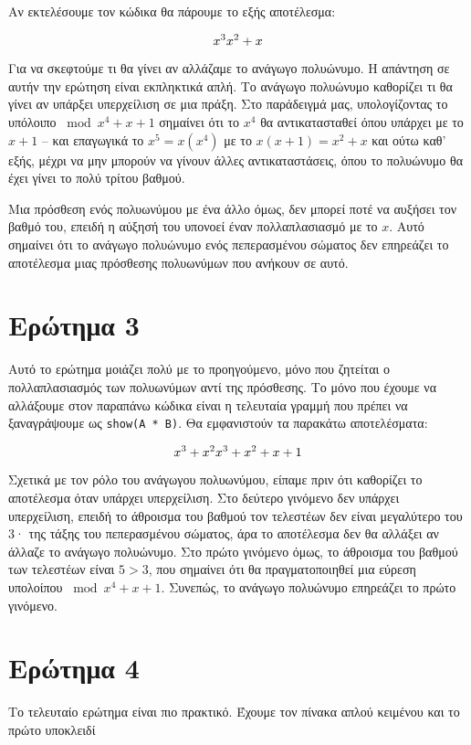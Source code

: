 \documentclass{article}
\begin{document}
Αν εκτελέσουμε τον κώδικα θα πάρουμε το εξής αποτέλεσμα:

$$
x^3 \\
x^2 + x
$$

Για να σκεφτούμε τι θα γίνει αν αλλάζαμε το ανάγωγο πολυώνυμο. Η απάντηση σε αυτήν την ερώτηση είναι εκπληκτικά απλή. Το ανάγωγο πολυώνυμο καθορίζει τι θα γίνει αν υπάρξει υπερχείλιση σε μια πράξη. Στο παράδειγμά μας, υπολογίζοντας το υπόλοιπο $\bmod x^4 + x + 1$ σημαίνει ότι το $x^4$ θα αντικατασταθεί όπου υπάρχει με το $x + 1$ -- και επαγωγικά το $x^5 = x(x^4)$ με το $x(x + 1) = x^2 + x$ και ούτω καθ' εξής, μέχρι να μην μπορούν να γίνουν άλλες αντικαταστάσεις, όπου το πολυώνυμο θα έχει γίνει το πολύ τρίτου βαθμού.

Μια πρόσθεση ενός πολυωνύμου με ένα άλλο όμως, δεν μπορεί ποτέ να αυξήσει τον βαθμό του, επειδή η αύξησή του υπονοεί έναν πολλαπλασιασμό με το $x$. Αυτό σημαίνει ότι το ανάγωγο πολυώνυμο ενός πεπερασμένου σώματος δεν επηρεάζει το αποτέλεσμα μιας πρόσθεσης πολυωνύμων που ανήκουν σε αυτό.

\section*{Ερώτημα 3}

Αυτό το ερώτημα μοιάζει πολύ με το προηγούμενο, μόνο που ζητείται ο πολλαπλασιασμός των πολυωνύμων αντί της πρόσθεσης. Το μόνο που έχουμε να αλλάξουμε στον παραπάνω κώδικα είναι η τελευταία γραμμή που πρέπει να ξαναγράψουμε ως \lstinline|show(A * B)|. Θα εμφανιστούν τα παρακάτω αποτελέσματα:

$$
x^3 + x^2 \\
x^3 + x^2 + x + 1
$$

Σχετικά με τον ρόλο του ανάγωγου πολυωνύμου, είπαμε πριν ότι καθορίζει το αποτέλεσμα όταν υπάρχει υπερχείλιση. Στο δεύτερο γινόμενο δεν υπάρχει υπερχείλιση, επειδή το άθροισμα του βαθμού τον τελεστέων δεν είναι μεγαλύτερο του $3$· της τάξης του πεπερασμένου σώματος, άρα το αποτέλεσμα δεν θα αλλάξει αν άλλαζε το ανάγωγο πολυώνυμο. Στο πρώτο γινόμενο όμως, το άθροισμα του βαθμού των τελεστέων είναι $5 > 3$, που σημαίνει ότι θα πραγματοποιηθεί μια εύρεση υπολοίπου $\bmod x^4 + x + 1$. Συνεπώς, το ανάγωγο πολυώνυμο επηρεάζει το πρώτο γινόμενο.

\section*{Ερώτημα 4}

Το τελευταίο ερώτημα είναι πιο πρακτικό. Έχουμε τον πίνακα απλού κειμένου και το πρώτο υποκλειδί
\end{document}
